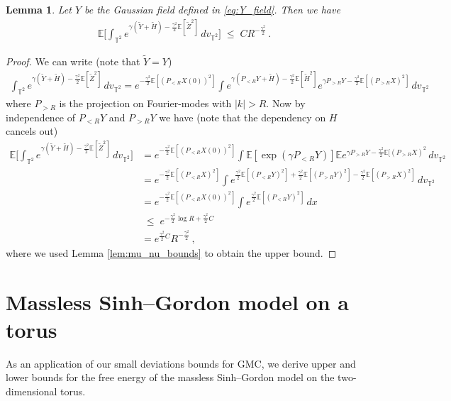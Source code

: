 \documentclass[11pt]{article}
\numberwithin{equation}{section}
\newtheorem{lemma}[theorem]{Lemma}
\theoremstyle{definition}
\renewcommand{\tilde}{\widetilde}          %
\renewcommand{\leq}{\;\leqslant\;}                   %
\newcommand{\E}{\mathbb{E}}
\def\T{\mathbb{T}}
\newcommand{\ab}{|}
\newcommand{\grea}{>}
\newcommand{\PR}{ {P_{< R}}}
\newcommand{\PRR}{ { P_{>R}} }
\begin{document}
\begin{lemma}\label{lem:E_nu}
Let $Y$ be the Gaussian field defined in \eqref{eq:Y_field}. Then we have
\begin{align*}
\E \Big[ \int_{\T^2} e^{\gamma (\tilde Y + \tilde H) - \frac{\gamma^2}{2} \E[\tilde Z^2]} \, dv_{\T^2} \Big] \leq C R^{-\frac{\gamma^2}{2}}\,.
\end{align*}
\end{lemma}  
\begin{proof}
We can write (note that $\tilde Y = Y$)
\begin{align*}
\int_{\T^2} e^{\gamma (\tilde Y + \tilde H) - \frac{\gamma^2}{2} \E[\tilde Z^2]} \, dv_{\T^2}  = e^{-\frac{\gamma^2}{2} \E[( \PR X(0))^2] }\int e^{\gamma  ( \PR Y + \tilde H) - \frac{\gamma^2}{2} \E[\tilde H^2]} e^{\gamma \PRR Y- \frac{\gamma^2}{2} \E[ (\PRR X )^2 ]} \, dv_{\T^2}
\end{align*}
where $\PRR$ is the projection on Fourier-modes with $ \ab k \ab \grea R$. Now by independence of $\PR Y$ and $ \PRR Y $ we have (note that the dependency on $H$ cancels out)
\begin{align*}
\E \Big[ \int_{\T^2} e^{\gamma (\tilde Y + \tilde H) - \frac{\gamma^2}{2} \E[\tilde Z^2]} \, dv_{\T^2} \Big]  &= e^{-\frac{\gamma^2}{2} \E[ (\PR X(0))^2 ]} \int  \mathbb{E} [\exp(\gamma \PR Y) ] \E e^{ \gamma \PRR Y - \frac{\gamma^2}{2} \E[(\PRR X)^2} \, dv_{\T^2}   \\
&=  e^{-\frac{\gamma^2}{2} \E[ ( \PR X)^2 ]} \int e^{\frac{\gamma^2}{2} \E[ ( \PR Y)^2 ] + \frac{\gamma^2}{2} \E[ ( \PRR Y )^2] - \frac{\gamma^2}{2} \E[ ( \PRR X)^2]} \, dv_{\T^2} \\
&= e^{-\frac{\gamma^2}{2} \E[ (\PR X(0))^2 ]} \int e^{\frac{\gamma^2}{2} \E[ ( \PR Y)^2 ]} \, dx \\
& \leq e^{-\frac{\gamma^2}{2} \log R + \frac{\gamma^2}{2} C} \\
&= e^{\frac{\gamma^2}{2} C} R^{-\frac{\gamma^2}{2}}\,,
\end{align*}
where we used Lemma \ref{lem:mu_nu_bounds} to obtain the upper bound.
\end{proof}



\section{Massless Sinh--Gordon model on a torus}\label{shg_section}

As an application of our small deviations bounds for GMC, we derive upper and lower bounds for the free energy of the massless Sinh--Gordon model on the two-dimensional torus.
\end{document}
